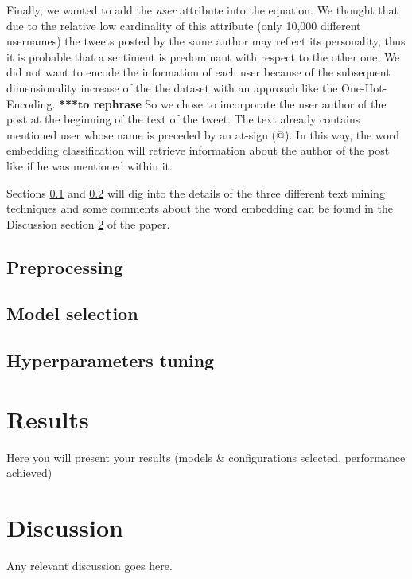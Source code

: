 \documentclass[conference]{IEEEtran}
\begin{document}
Finally, we wanted to add the \textit{user} attribute into the equation. We thought that due to the relative low cardinality of this attribute (only 10,000 different usernames) the tweets posted by the same author may reflect its personality, thus it is probable that a sentiment is predominant with respect to the other one. We did not want to encode the information of each user because of the subsequent dimensionality increase of the the dataset with an approach like the One-Hot-Encoding\cite{ohe}. \textbf{***to rephrase}
So we chose to incorporate the user author of the post at the beginning of the text of the tweet. The text already contains mentioned user whose name is preceded by an at-sign (@). In this way, the word embedding classification will retrieve information about the author of the post like if he was mentioned within it.

Sections \ref{sec:preprocessing} and \ref{sec:model} will dig into the details of the three different text mining techniques and some comments about the word embedding can be found in the Discussion section \ref{sec:discussion} of the paper.

\subsection{Preprocessing}\label{sec:preprocessing}

\subsection{Model selection}\label{sec:model}
\subsection{Hyperparameters tuning}\label{sec:hypertuning}

\section{Results}\label{sec:results}
Here you will present your results (models \& configurations selected, performance achieved)

\section{Discussion}\label{sec:discussion}
Any relevant discussion goes here.



\end{document}
